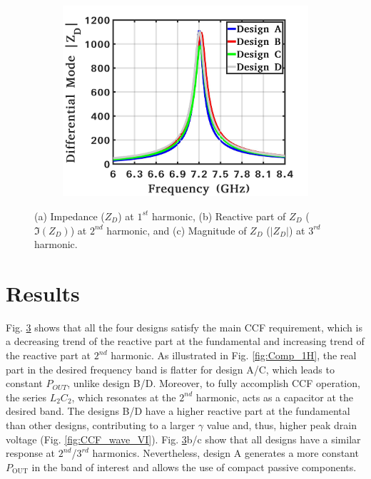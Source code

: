 \documentclass[conference]{IEEEtran}
\begin{document}
\begin{figure}[!t]
\begin{subfigure}{0.24\textwidth}
		\caption{}
		\label{fig:Comp_2H_imag}
	\end{subfigure}
	\begin{subfigure}{0.24\textwidth}
		\includegraphics[width=1\textwidth]{Images/Output_Network_Comp/Comp_3H_Mag.pdf}
		\caption{}
		\label{fig:Comp_3H_Mag}
	\end{subfigure}
	\caption{(a) Impedance ($Z_D$) at $1^{st}$ harmonic, (b) Reactive part of $Z_D$ ($\Im(Z_D)$) at $2^{nd}$ harmonic, and (c) Magnitude of $Z_D$ ($|Z_D|$) at $3^{rd}$ harmonic.}
	\label{fig:Comp_1H_2H_3H}
	\vspace{-0.25in}
\end{figure}

\section{Results}
\label{section:Results}

Fig. \ref{fig:Comp_1H_2H_3H} shows that all the four designs satisfy the main CCF requirement, which is a decreasing trend of the reactive part at the fundamental and increasing trend of the reactive part at $2^{nd}$ harmonic. As illustrated in Fig. \ref{fig:Comp_1H}, the real part in the desired frequency band is flatter for design A/C, which leads to constant $P_{OUT}$, unlike design B/D. Moreover, to fully accomplish CCF operation, the series $L_2C_2$, which resonates at the $2^{nd}$ harmonic, acts as a capacitor at the desired band. The designs B/D have a higher reactive part at the fundamental than other designs, contributing to a larger $\gamma$ value and, thus, higher peak drain voltage (Fig. \ref{fig:CCF_wave_VI}). Fig. \ref{fig:Comp_1H_2H_3H}b/c show that all designs have a similar response at $2^{nd}$/$3^{rd}$ harmonics. Nevertheless, design A generates a more constant $P_{\text{OUT}}$ in the band of interest and allows the use of compact passive components. 
\end{document}
